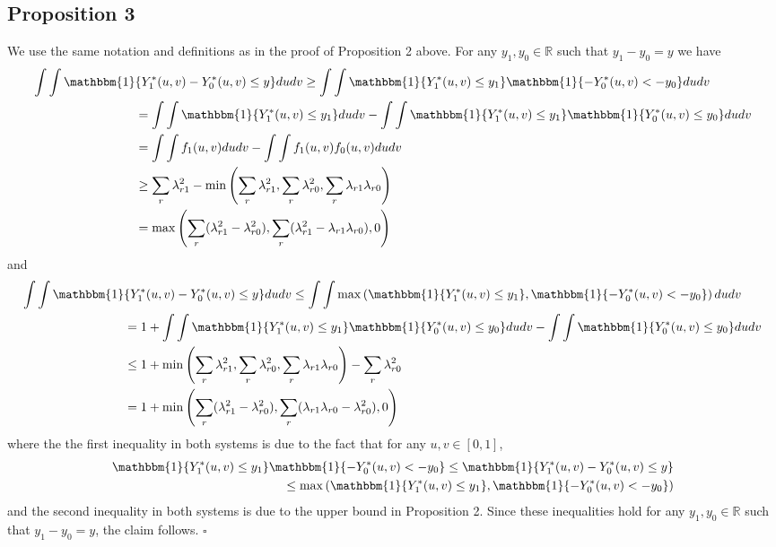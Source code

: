 \documentclass[12pt]{article}
\theoremstyle{definition}
\begin{document}
\subsection{Proposition 3}
We use the same notation and definitions as in the proof of Proposition 2 above. For any $y_{1},y_{0} \in \mathbb{R}$ such that $y_{1}-y_{0} = y$ we have
\begin{align*}
 \int\int \mathbbm{1}&\{Y_{1}^{*}(u,v)-Y_{0}^{*}(u,v) \leq y\} dudv
\geq  \int\int \mathbbm{1}\{Y_{1}^{*}(u,v) \leq y_{1}\}\mathbbm{1}\{-Y_{0}^{*}(u,v) < -y_{0}\}  dudv \\
&= \int\int \mathbbm{1}\{Y_{1}^{*}(u,v) \leq y_{1}\}dudv -  \int\int \mathbbm{1}\{Y_{1}^{*}(u,v) \leq y_{1}\}\mathbbm{1}\{Y_{0}^{*}(u,v) \leq y_{0}\}  dudv \\
&=\int\int f_{1}(u,v) dudv -  \int\int f_{1}(u,v)f_{0}(u,v)dudv \\
&\geq \sum_{r}\lambda_{r1}^{2} - \min\left(\sum_{r}\lambda_{r1}^{2},\sum_{r}\lambda_{r0}^{2},\sum_{r}\lambda_{r1}\lambda_{r0}\right) \\
&= \max\left(\sum_{r}(\lambda_{r1}^{2}-\lambda_{r0}^{2}),\sum_{r}(\lambda_{r1}^{2} - \lambda_{r1}\lambda_{r0}),0\right)
\end{align*}
and 
\begin{align*}
 \int\int \mathbbm{1}&\{Y_{1}^{*}(u,v)-Y_{0}^{*}(u,v) \leq y\} dudv
 \leq \int\int  \max\left(\mathbbm{1}\{ Y_{1}^{*}(u,v) \leq y_{1} \},\mathbbm{1}\{-Y_{0}^{*}(u,v) < -y_{0}\}\right) dudv\\
&= 1 +  \int\int \mathbbm{1}\{Y_{1}^{*}(u,v) \leq y_{1}\}\mathbbm{1}\{Y_{0}^{*}(u,v) \leq y_{0}\}  dudv - \int\int \mathbbm{1}\{Y_{0}^{*}(u,v) \leq y_{0}\}dudv \\
&\leq 1 + \min\left(\sum_{r}\lambda_{r1}^{2},\sum_{r}\lambda_{r0}^{2},\sum_{r}\lambda_{r1}\lambda_{r0}\right) - \sum_{r}\lambda_{r0}^{2} \\
&= 1 + \min\left(\sum_{r}(\lambda_{r1}^{2}-\lambda_{r0}^{2}),\sum_{r}(\lambda_{r1}\lambda_{r0} - \lambda_{r0}^{2}),0\right)
\end{align*}
where the the first inequality in both systems is due to the fact that for any $u,v \in [0,1]$, 
\begin{align*}
\mathbbm{1}\{Y_{1}^{*}(u,v) \leq y_{1}\}\mathbbm{1}\{-Y_{0}^{*}(u,v) < -y_{0}\} 
\leq \mathbbm{1}\{Y_{1}^{*}(u,v)-Y_{0}^{*}(u,v) \leq y\}\\
\leq \max\left(\mathbbm{1}\{ Y_{1}^{*}(u,v) \leq y_{1} \},\mathbbm{1}\{-Y_{0}^{*}(u,v) < -y_{0}\}\right)
\end{align*}
and the second inequality in both systems is due to the upper bound in Proposition 2. Since these inequalities hold for any $y_{1},y_{0} \in \mathbb{R}$ such that $y_{1} - y_{0} = y$, the claim follows. $\square$
\end{document}
